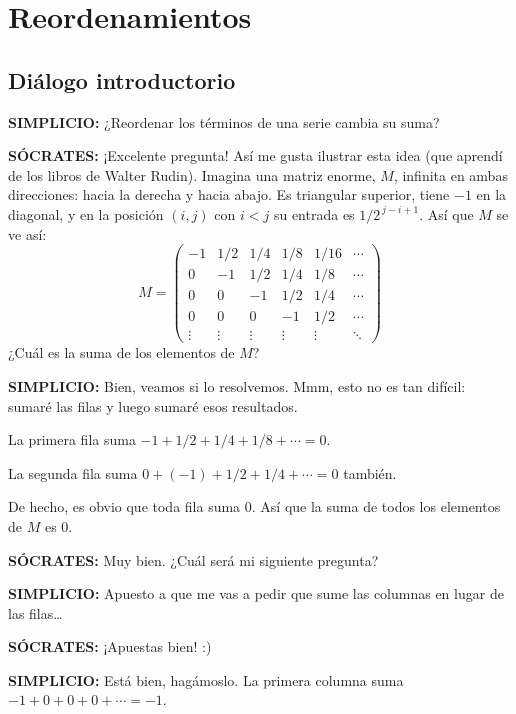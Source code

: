 \chapter{Reordenamientos}

\section*{Diálogo introductorio}

\noindent\textbf{SIMPLICIO:} ¿Reordenar los términos de una serie cambia su suma?

\medskip
\noindent\textbf{SÓCRATES:} ¡Excelente pregunta! Así me gusta ilustrar esta idea (que aprendí de los libros de Walter Rudin). Imagina una matriz enorme, $M$, infinita en ambas direcciones: hacia la derecha y hacia abajo. Es triangular superior, tiene $-1$ en la diagonal, y en la posición $(i,j)$ con $i<j$ su entrada es $1/2^{\,j-i+1}$. Así que $M$ se ve así:
\[
M =
\begin{pmatrix}
-1 & 1/2 & 1/4 & 1/8 & 1/16 & \cdots\\
0 & -1 & 1/2 & 1/4 & 1/8 & \cdots\\
0 & 0 & -1 & 1/2 & 1/4 & \cdots\\
0 & 0 & 0 & -1 & 1/2 & \cdots\\
\vdots & \vdots & \vdots & \vdots & \vdots & \ddots
\end{pmatrix}
\]
¿Cuál es la suma de los elementos de $M$?

\medskip
\noindent\textbf{SIMPLICIO:} Bien, veamos si lo resolvemos. Mmm, esto no es tan difícil: sumaré las filas y luego sumaré esos resultados.

La primera fila suma $-1 + 1/2 + 1/4 + 1/8 + \cdots = 0$.

La segunda fila suma $0 + (-1) + 1/2 + 1/4 + \cdots = 0$ también.

De hecho, es obvio que toda fila suma $0$. Así que la suma de todos los elementos de $M$ es $0$.

\medskip
\noindent\textbf{SÓCRATES:} Muy bien. ¿Cuál será mi siguiente pregunta?

\medskip
\noindent\textbf{SIMPLICIO:} Apuesto a que me vas a pedir que sume las columnas en lugar de las filas\dots{}

\medskip
\noindent\textbf{SÓCRATES:} ¡Apuestas bien! :)

\medskip
\noindent\textbf{SIMPLICIO:} Está bien, hagámoslo. La primera columna suma $-1 + 0 + 0 + 0 + \cdots = -1$.

